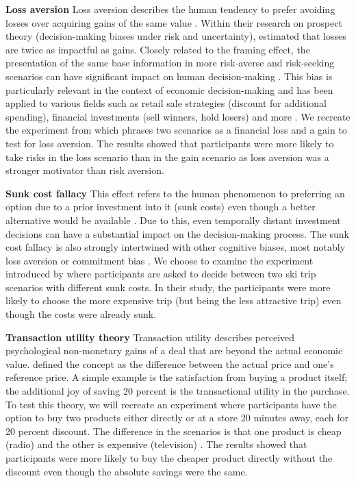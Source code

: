 \par \textbf{Loss aversion} Loss aversion describes the human tendency to prefer avoiding losses over acquiring gains of the same value  \parencite{liu2023review}. Within their research on prospect theory (decision-making biases under risk and uncertainty), \textcite{tversky1992advances} estimated that losses are twice as impactful as gains. Closely related to the framing effect, the presentation of the same base information in more risk-averse and risk-seeking scenarios can have significant impact on human decision-making \parencite{druckman2001evaluating}. This bias is particularly relevant in the context of economic decision-making and has been applied to various fields such as retail sale strategies (discount for additional spending), financial investments (sell winners, hold losers) and more \parencite{liu2023review}. We recreate the experiment from \textcite{thaler2015misbehaving} which phrases two scenarios as a financial loss and a gain to test for loss aversion. The results showed that participants were more likely to take risks in the loss scenario than in the gain scenario as loss aversion was a stronger motivator than risk aversion.

\par \textbf{Sunk cost fallacy} This effect refers to the human phenomenon to preferring an option due to a prior investment into it (sunk costs) even though a better alternative would be available \parencite{arkes1985psychology}. Due to this, even temporally distant investment decisions can have a substantial impact on the decision-making process. The sunk cost fallacy is also strongly intertwined with other cognitive biases, most notably loss aversion or commitment bias \parencite{jarmolowicz2016sunk}. We choose to examine the experiment introduced by \textcite{arkes1985psychology} where participants are asked to decide between two ski trip scenarios with different sunk costs. In their study, the participants were more likely to choose the more expensive trip (but being the less attractive trip) even though the costs were already sunk.

\par \textbf{Transaction utility theory} Transaction utility describes perceived psychological non-monetary gains of a deal that are beyond the actual economic value. \textcite{thaler1983transaction} defined the concept as the difference between the actual price and one's reference price. A simple example is the satisfaction from buying a product itself; the additional joy of saving 20 percent is the transactional utility in the purchase. To test this theory, we will recreate an experiment where participants have the option to buy two products either directly or at a store 20 minutes away, each for 20 percent discount. The difference in the scenarios is that one product is cheap (radio) and the other is expensive (television) \parencite{thaler1983transaction}. The results showed that participants were more likely to buy the cheaper product directly without the discount even though the absolute savings were the same.

